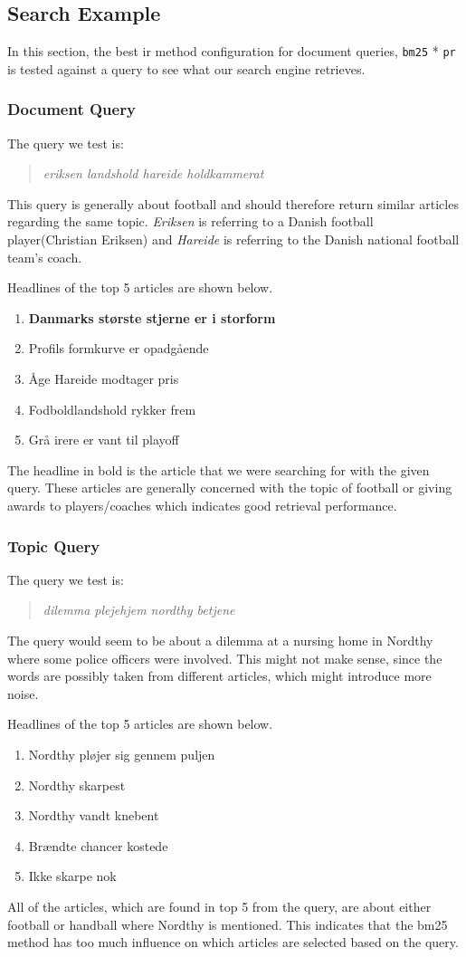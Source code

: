 \subsection{Search Example}
In this section, the best \gls{ir} method configuration for document queries, \texttt{\gls{bm25}} * \texttt{\gls{pr}} is tested against a query to see what our search engine retrieves.


\subsubsection{Document Query}
The query we test is:
\begin{quotation}
	\textit{eriksen landshold hareide holdkammerat}
\end{quotation}
This query is generally about football and should therefore return similar articles regarding the same topic.
\textit{Eriksen} is referring to a Danish football player(Christian Eriksen) and \textit{Hareide} is referring to the Danish national football team's coach.


\noindent Headlines of the top 5 articles are shown below.
\begin{enumerate}
	\item \textbf{Danmarks største stjerne er i storform}
	\item Profils formkurve er opadgående
	\item Åge Hareide modtager pris
	\item Fodboldlandshold rykker frem
	\item Grå irere er vant til playoff
\end{enumerate}
The headline in bold is the article that we were searching for with the given query. 
These articles are generally concerned with the topic of football or giving awards to players/coaches which indicates good retrieval performance.


\subsubsection{Topic Query}
The query we test is:
\begin{quotation}
	\textit{dilemma plejehjem nordthy betjene}
\end{quotation}
The query would seem to be about a dilemma at a nursing home in Nordthy where some police officers were involved. 
This might not make sense, since the words are possibly taken from different articles, which might introduce more noise.

\noindent Headlines of the top 5 articles are shown below.
\begin{enumerate}
	\item Nordthy pløjer sig gennem puljen
	\item Nordthy skarpest
	\item Nordthy vandt knebent
	\item Brændte chancer kostede
	\item Ikke skarpe nok
\end{enumerate}
All of the articles, which are found in top 5 from the query, are about either football or handball where Nordthy is mentioned.
This indicates that the \gls{bm25} method has too much influence on which articles are selected based on the query.

